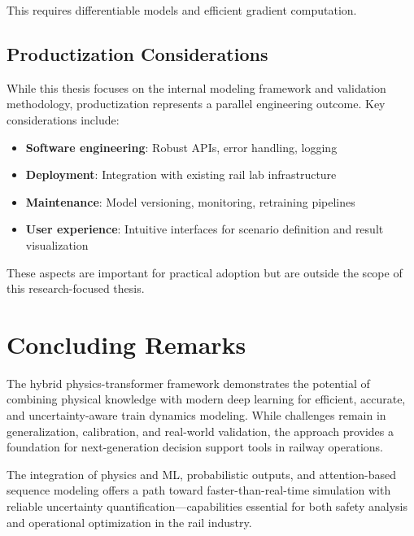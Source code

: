 This requires differentiable models and efficient gradient computation.


\subsection{Productization Considerations}

While this thesis focuses on the internal modeling framework and validation methodology, productization represents a parallel engineering outcome. Key considerations include:
\begin{itemize}
    \item \textbf{Software engineering}: Robust APIs, error handling, logging
    \item \textbf{Deployment}: Integration with existing rail lab infrastructure
    \item \textbf{Maintenance}: Model versioning, monitoring, retraining pipelines
    \item \textbf{User experience}: Intuitive interfaces for scenario definition and result visualization
\end{itemize}

These aspects are important for practical adoption but are outside the scope of this research-focused thesis.


\section{Concluding Remarks}

The hybrid physics-transformer framework demonstrates the potential of combining physical knowledge with modern deep learning for efficient, accurate, and uncertainty-aware train dynamics modeling. While challenges remain in generalization, calibration, and real-world validation, the approach provides a foundation for next-generation decision support tools in railway operations.

The integration of physics and ML, probabilistic outputs, and attention-based sequence modeling offers a path toward faster-than-real-time simulation with reliable uncertainty quantification—capabilities essential for both safety analysis and operational optimization in the rail industry.

